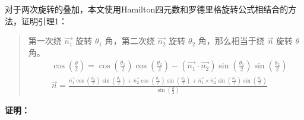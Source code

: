 \documentclass[withoutpreface,bwprint]{cumcmthesis} %
\begin{document}
对于两次旋转的叠加，本文使用Hamilton四元数和罗德里格旋转公式相结合的方法，证明引理1：
\begin{quote}
    第一次绕 $\overrightarrow{n_1}$ 旋转 $\theta _1$ 角，第二次绕 $\overrightarrow{n_2}$
    旋转 $\theta _2$ 角，那么相当于绕 $\overrightarrow{n}$ 旋转 $\theta$ 角。
    \[
        \begin{split}
            &\cos(\frac{\theta}{2}) = \cos(\frac{\theta _1}{2})
            \cos(\frac{\theta _2}{2}) - (\overrightarrow{n_1} \cdot 
            \overrightarrow{n_2})\sin(\frac{\theta _1}{2})
            \sin(\frac{\theta _2}{2}) \\
            &\overrightarrow{n} = \frac{\displaystyle \overrightarrow{n_1}
            \cos(\frac{\theta _2}{2})\sin(\frac{\theta _1}{2}) + 
            \overrightarrow{n_2}\cos(\frac{\theta _1}{2})
            \sin(\frac{\theta _2}{2}) + \overrightarrow{n_1} \times 
            \overrightarrow{n_2}\sin(\frac{\theta _1}{2})
            \sin(\frac{\theta _2}{2})}
            {\displaystyle \sin(\frac{\theta}{2})} 
        \end{split}
    \]
\end{quote}

\noindent\textbf{证明：}
\end{document}
